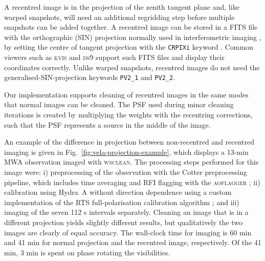 \documentclass[useAMS,usenatbib]{mn2e}
\begin{document}
A recentred image is in the projection of the zenith tangent plane and, like warped snapshots, will need an additional regridding step before multiple snapshots can be added together. A recentred image can be stored in a FITS file with the orthographic (SIN) projection normally used in interferometric imaging \citep{fits-coordinates-2002}, by setting the centre of tangent projection with the \texttt{CRPIXi} keyword \citep{wcs-in-fits}. Common viewers such as \textsc{kvis} \citep{karma-1996} and \textsc{ds9} support such FITS files and display their coordinates correctly. Unlike warped snapshots, recentred images do not need the generalised-SIN-projection keywords \texttt{PV2\_1} and \texttt{PV2\_2}.

Our implementation supports cleaning of recentred images in the same modes that normal images can be cleaned. The PSF used during minor cleaning iterations is created by multiplying the weights with the recentring corrections, such that the PSF represents a source in the middle of the image.

An example of the difference in projection between non-recentred and recentred imaging is given in Fig.~\ref{fig:vela-projection-example}, which displays a 13-min MWA observation imaged with \textsc{wsclean}. The processing steps performed for this image were: i) preprocessing of the observation with the Cotter preprocessing pipeline, which includes time averaging and RFI flagging with the \textsc{aoflagger} \citep{post-correlation-rfi-classification,scale-invariant-rank-operator}; ii) calibration using Hydra~A without direction dependence using a custom implementation of the RTS full-polarisation calibration algorithm \citep{rts-mwa}; and iii) imaging of the seven 112 s intervals separately. Cleaning an image that is in a different projection yields slightly different results, but qualitatively the two images are clearly of equal accuracy. The wall-clock time for imaging is 60 min and 41 min for normal projection and the recentred image, respectively. Of the 41 min, 3 min is spent on phase rotating the visibilities. 
\end{document}
